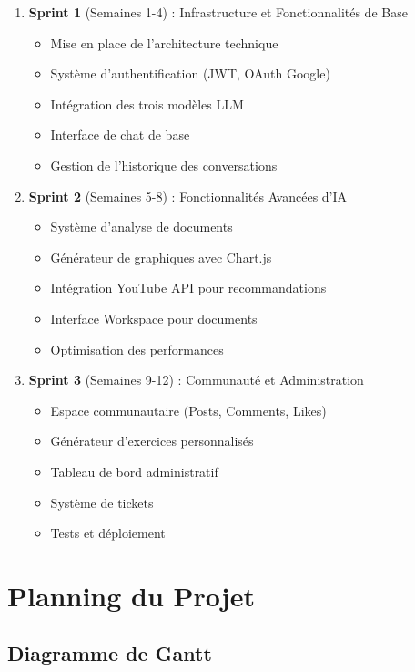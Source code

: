 \begin{enumerate}
    \item \textbf{Sprint 1} (Semaines 1-4) : Infrastructure et Fonctionnalités de Base
    \begin{itemize}
        \item Mise en place de l'architecture technique
        \item Système d'authentification (JWT, OAuth Google)
        \item Intégration des trois modèles LLM
        \item Interface de chat de base
        \item Gestion de l'historique des conversations
    \end{itemize}
    
    \item \textbf{Sprint 2} (Semaines 5-8) : Fonctionnalités Avancées d'IA
    \begin{itemize}
        \item Système d'analyse de documents
        \item Générateur de graphiques avec Chart.js
        \item Intégration YouTube API pour recommandations
        \item Interface Workspace pour documents
        \item Optimisation des performances
    \end{itemize}
    
    \item \textbf{Sprint 3} (Semaines 9-12) : Communauté et Administration
    \begin{itemize}
        \item Espace communautaire (Posts, Comments, Likes)
        \item Générateur d'exercices personnalisés
        \item Tableau de bord administratif
        \item Système de tickets
        \item Tests et déploiement
    \end{itemize}
\end{enumerate}

\section{Planning du Projet}

\subsection{Diagramme de Gantt}

